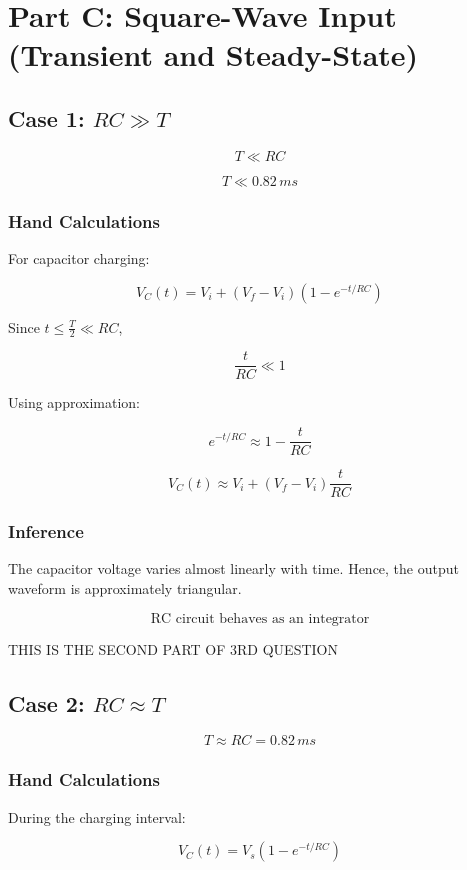 \section{Part C: Square-Wave Input (Transient and Steady-State)}
\subsection{Case 1: $RC \gg T$}

\[
T \ll RC
\]

\[
T \ll 0.82\,ms
\]


\subsubsection*{Hand Calculations}

For capacitor charging:

\begin{equation}
V_C(t) = V_i + (V_f - V_i)\left(1 - e^{-t/RC}\right)
\end{equation}

Since $t \le \frac{T}{2} \ll RC$,

\[
\frac{t}{RC} \ll 1
\]

Using approximation:

\[
e^{-t/RC} \approx 1 - \frac{t}{RC}
\]

\[
V_C(t) \approx V_i + (V_f - V_i)\frac{t}{RC}
\]

\subsubsection*{Inference}

The capacitor voltage varies almost linearly with time.  
Hence, the output waveform is approximately triangular.

\[
\boxed{\text{RC circuit behaves as an integrator}}
\]

THIS IS THE SECOND PART OF 3RD QUESTION
\subsection{Case 2: $RC \approx T$}

\[
T \approx RC = 0.82\,ms
\]

\subsubsection*{Hand Calculations}

During the charging interval:

\begin{equation}
V_C(t) = V_s\left(1 - e^{-t/RC}\right)
\end{equation}

